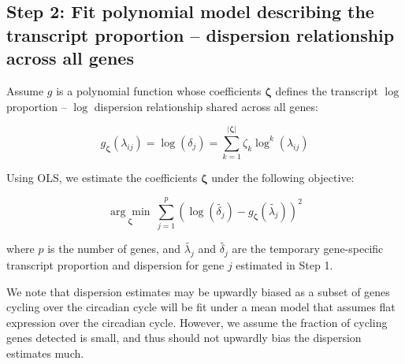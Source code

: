 \documentclass[12pt]{article}
\begin{document}
\subsection*{Step 2: Fit polynomial model describing the transcript proportion -- dispersion relationship across all genes}

Assume $g$ is a polynomial function whose coefficients $\boldsymbol{\zeta}$ defines the transcript
$\log$ proportion -- $\log$ dispersion relationship shared across all genes:

\begin{equation}
g_{\boldsymbol{\zeta}}\!\left( \lambda_{ij} \right) = \log\!\left( \delta_{j} \right) = \sum_{k=1}^{|\boldsymbol{\zeta}|} \zeta_{k} \log^{k}\!\left( \lambda_{ij} \right) \tag{27}
\end{equation}

Using OLS, we estimate the coefficients $\boldsymbol{\zeta}$ under the following objective:

\begin{equation}
\underset{\boldsymbol{\zeta}}{\arg\min}\ \sum_{j=1}^{p} \left( \log\!\left( \widetilde{\delta_{j}} \right) - g_{\boldsymbol{\zeta}}\!\left( \widetilde{\lambda_{j}} \right) \right)^{2} \tag{28}
\end{equation}

where $p$ is the number of genes, and $\widetilde{\lambda_{j}}$ and $\widetilde{\delta_{j}}$ are the
temporary gene-specific transcript proportion and dispersion for gene $j$ estimated in Step 1.


We note that dispersion estimates may be upwardly biased as a subset of genes cycling over the
circadian cycle will be fit under a mean model that assumes flat expression over the circadian
cycle. However, we assume the fraction of cycling genes detected is small, and thus should not
upwardly bias the dispersion estimates much.
\end{document}
